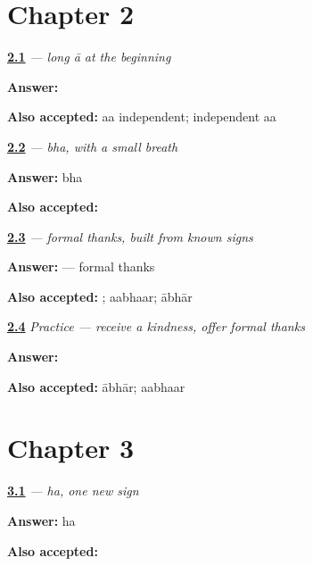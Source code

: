 \section*{Chapter 2}

\noindent\begin{minipage}[t]{\linewidth}
\raggedright
\hyperlink{review-MW-W02-aa-independent-choice}{\textbf{2.1}} \emph{ — long \emph{ā} at the beginning}\par
\small \textbf{Answer:} \par
\footnotesize \textbf{Also accepted:} aa independent; independent aa
\end{minipage}\par\medskip

\noindent\begin{minipage}[t]{\linewidth}
\raggedright
\hyperlink{review-MW-W02-bha-sound}{\textbf{2.2}} \emph{ — \emph{bha}, with a small breath}\par
\small \textbf{Answer:} bha\par
\footnotesize \textbf{Also accepted:} 
\end{minipage}\par\medskip

\noindent\begin{minipage}[t]{\linewidth}
\raggedright
\hyperlink{review-MW-C02-aabhaar-build}{\textbf{2.3}} \emph{ — formal thanks, built from known signs}\par
\small \textbf{Answer:}  — formal thanks\par
\footnotesize \textbf{Also accepted:} ; aabhaar; ābhār
\end{minipage}\par\medskip

\noindent\begin{minipage}[t]{\linewidth}
\raggedright
\hyperlink{review-MW-C02-practice-thanks}{\textbf{2.4}} \emph{Practice — receive a kindness, offer formal thanks}\par
\small \textbf{Answer:} \par
\footnotesize \textbf{Also accepted:} ābhār; aabhaar
\end{minipage}\par\medskip

\section*{Chapter 3}

\noindent\begin{minipage}[t]{\linewidth}
\raggedright
\hyperlink{review-MW-W03-ha-read}{\textbf{3.1}} \emph{ — \emph{ha}, one new sign}\par
\small \textbf{Answer:} ha\par
\footnotesize \textbf{Also accepted:} 
\end{minipage}\par\medskip

